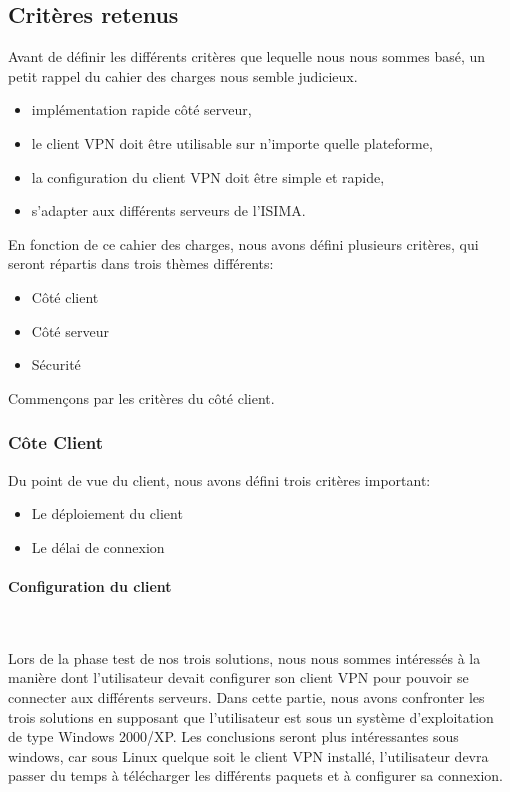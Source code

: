 \subsection{Critères retenus}

Avant de définir les différents critères que lequelle nous nous sommes basé, un petit rappel du cahier des charges nous semble judicieux.


\begin{itemize}
 	\item implémentation rapide côté serveur,
	\item le client VPN doit être utilisable sur n'importe quelle plateforme,
	\item la configuration du client VPN doit être simple et rapide,
	\item s'adapter aux différents serveurs de l'ISIMA.
\end{itemize}


En fonction de ce cahier des charges, nous avons défini plusieurs critères, qui seront répartis dans trois thèmes différents:

\begin{itemize}
 	\item Côté client 
 	\item Côté serveur
 	\item Sécurité
\end{itemize}

 Commençons par les critères du côté client. 


\subsubsection{Côte Client}

Du point de vue du client, nous avons défini trois critères important:
\begin{itemize}
 	\item Le déploiement du client
	\item Le délai de connexion
\end{itemize}

\paragraph{Configuration du client}
~


Lors de la phase test de nos trois solutions, nous nous sommes intéressés à la manière dont l'utilisateur devait configurer son client VPN pour pouvoir se connecter aux différents serveurs. Dans cette partie, nous avons confronter les trois solutions en supposant que l'utilisateur est sous un système d'exploitation de type Windows 2000/XP. Les conclusions seront plus intéressantes sous windows, car sous Linux quelque soit le client VPN installé, l'utilisateur devra passer du temps à télécharger les différents paquets et à configurer sa connexion.

